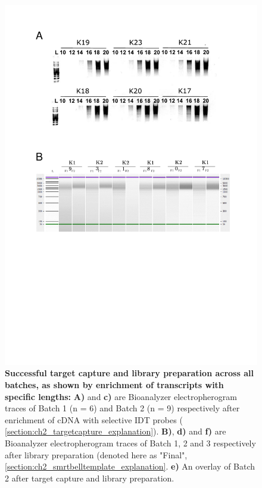 \begin{figure}[htp]
	\label{fig:isoseq_targeted_pccresults}
\end{figure}


\begin{figure}[!htp]
	\centering
	\vspace{20pt}
	\includegraphics[page=2,trim={0 8cm 0cm 1cm},clip,scale = 0.75]{Figures/TargetedTranscriptome_ppt.pdf}
	\captionsetup{width=0.95\textwidth}
	\caption[Iso-Seq Targeted Transcriptome - Target Capture and library preparation]%
	{\textbf{Successful target capture and library preparation across all batches, as shown by enrichment of transcripts with specific lengths:} \textbf{A)} and \textbf{c)} are Bioanalyzer electropherogram traces of Batch 1 (n = 6) and Batch 2 (n = 9) respectively after enrichment of cDNA with selective IDT probes ( \cref{section:ch2_targetcapture_explanation}). \textbf{B)}, \textbf{d)} and \textbf{f)} are Bioanalyzer electropherogram traces of Batch 1, 2 and 3 respectively after library preparation (denoted here as "Final", \cref{section:ch2_smrtbelltemplate_explanation}. \textbf{e)} An overlay of Batch 2 after target capture and library preparation. 
}
\end{figure}

